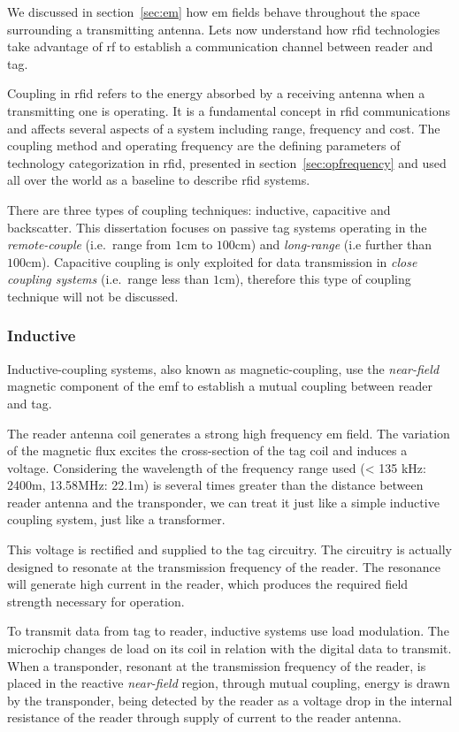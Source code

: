 We discussed in section~\ref{sec:em} how \acl{em} fields behave throughout the space surrounding a transmitting antenna. Lets now understand how \ac{rfid} technologies take advantage of \acl{rf} to establish a communication channel between reader and tag.

Coupling in \ac{rfid} refers to the energy absorbed by a receiving antenna when a transmitting one is operating. 
It is a fundamental concept in \ac{rfid} communications and affects several aspects of a system including range, frequency and cost.
The coupling method and operating frequency are the defining parameters of technology categorization in \ac{rfid}, presented in section~\ref{sec:opfrequency} and used all over the world as a baseline to describe \ac{rfid} systems.

There are three types of coupling techniques: inductive, capacitive and backscatter. 
This dissertation focuses on passive tag systems operating in the \emph{remote-couple} (i.e.\ range from $1$cm to $100$cm) and \emph{long-range} (i.e further than $100$cm).
Capacitive coupling is only exploited for data transmission in \emph{close coupling systems} (i.e.\ range less than $1$cm), therefore this type of coupling technique will not be discussed.

\subsubsection{Inductive}

Inductive-coupling systems, also known as magnetic-coupling, use the \emph{near-field} magnetic component of the \ac{emf} to establish a mutual coupling between reader and tag.

The reader antenna coil generates a strong high frequency \ac{em} field. The variation of the magnetic flux excites the cross-section of the tag coil and induces a voltage.
Considering the wavelength of the frequency range used (< 135 kHz: 2400m, 13.58MHz: 22.1m) is several times greater than the distance between reader antenna and the transponder, we can treat it just like a simple inductive coupling system, just like a transformer.

This voltage is rectified and supplied to the tag circuitry.
The circuitry is actually designed to resonate at the transmission frequency of the reader. The resonance will generate high current in the reader, which produces the required field strength necessary for operation.

To transmit data from tag to reader, inductive systems use load modulation. The microchip changes de load on its coil in relation with the digital data to transmit. When a transponder, resonant at the transmission frequency of the reader, is placed in the reactive \emph{near-field} region, through mutual coupling, energy is drawn by the transponder, being detected by the reader as a voltage drop in the internal resistance of the reader through supply of current to the reader antenna.

